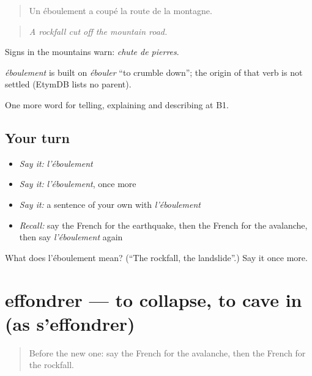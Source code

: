 \begin{quote}
Un éboulement a coupé la route de la montagne.
\end{quote}

\begin{quote}
\emph{A rockfall cut off the mountain road.}
\end{quote}

Signs in the mountains warn: \emph{chute de pierres}.

\begin{cousinweb}
\emph{éboulement} is built on \emph{ébouler} \textquotedblleft{}to crumble down\textquotedblright{}; the origin of that verb is not settled (EtymDB lists no parent).
\end{cousinweb}

\begin{grammarlens}[title={What you've built}]
One more word for telling, explaining and describing at B1.
\end{grammarlens}

\subsection*{Your turn}
\begin{itemize}
\raggedright
  \item \emph{Say it:} \emph{l'éboulement}
  \item \emph{Say it:} \emph{l'éboulement}, once more
  \item \emph{Say it:} a sentence of your own with \emph{l'éboulement}
  \item \emph{Recall:} say the French for the earthquake, then the French for the avalanche, then say \emph{l'éboulement} again
\end{itemize}

\begin{tcolorbox}[breakable,colback=teal!4,colframe=teal!35!black,title={Before you move on}]
What does l'éboulement mean? (\textquotedblleft{}The rockfall, the landslide\textquotedblright{}.) Say it once more.
\end{tcolorbox}
\section[effondrer]{effondrer — to collapse, to cave in (as s'effondrer)}

\label{lesson:FR-C303-effondrer}



\begin{quote}
Before the new one: say the French for the avalanche, then the French for the rockfall.
\end{quote}

